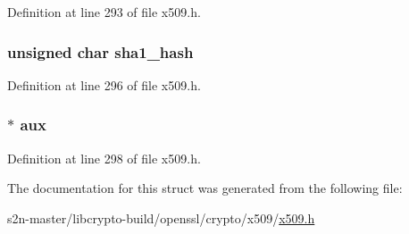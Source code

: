 Definition at line 293 of file x509.\+h.

\subsubsection[{\texorpdfstring{sha1\+\_\+hash}{sha1_hash}}]{\setlength{\rightskip}{0pt plus 5cm}unsigned char sha1\+\_\+hash}\hypertarget{structx509__st_a6ed2c3bc0848dcff0d9d3ebe8ba5273a}{}\label{structx509__st_a6ed2c3bc0848dcff0d9d3ebe8ba5273a}


Definition at line 296 of file x509.\+h.

\subsubsection[{\texorpdfstring{aux}{aux}}]{ $\ast$ aux}\hypertarget{structx509__st_a1871c6911bf6745ca89c79280d445186}{}\label{structx509__st_a1871c6911bf6745ca89c79280d445186}


Definition at line 298 of file x509.\+h.



The documentation for this struct was generated from the following file\+:\begin{DoxyCompactItemize}
\item 
s2n-\/master/libcrypto-\/build/openssl/crypto/x509/\hyperlink{crypto_2x509_2x509_8h}{x509.\+h}\end{DoxyCompactItemize}
